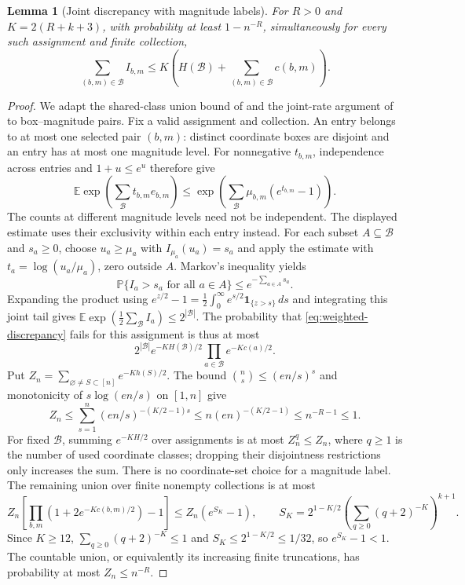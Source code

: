 \documentclass[11pt]{article}
\theoremstyle{spaced}
\newtheorem{lemma}[theorem]{Lemma}
\theoremstyle{remark}
\numberwithin{equation}{section}
\newcommand{\E}{\mathbb E}
\newcommand{\Pp}{\mathbb P}
\begin{document}
\begin{lemma}[Joint discrepancy with magnitude labels]\label{lem:weighted-discrepancy}
For $R>0$ and $K=2(R+k+3)$, with probability at least $1-n^{-R}$,
simultaneously for every such assignment and finite collection,
\begin{equation}\label{eq:weighted-discrepancy}
 \sum_{(b,m)\in\mathcal B}I_{b,m}
 \le K\left(H(\mathcal B)+\sum_{(b,m)\in\mathcal B}c(b,m)\right).
\end{equation}
\end{lemma}
\begin{proof}
We adapt the shared-class union bound of \cite[Lemmas~4.4--4.5]{ZZ}
and the joint-rate argument of \cite[Lemma~5.1]{ZZ} to box--magnitude pairs.
Fix a valid assignment and collection. An entry belongs to at most one
selected pair $(b,m)$: distinct coordinate boxes are disjoint and an
entry has at most one magnitude level. For nonnegative $t_{b,m}$,
independence across entries and $1+u\le e^u$ therefore give
\[
 \E\exp\left(\sum_{\mathcal B}t_{b,m}e_{b,m}\right)
 \le\exp\left(\sum_{\mathcal B}\mu_{b,m}(e^{t_{b,m}}-1)\right).
\]
The counts at different magnitude levels need not be independent.
The displayed estimate uses their exclusivity within each entry instead.
For each subset $A\subseteq\mathcal B$ and $s_a\ge0$, choose
$u_a\ge\mu_a$ with $I_{\mu_a}(u_a)=s_a$ and apply the estimate with
$t_a=\log(u_a/\mu_a)$, zero outside $A$. Markov's inequality yields
\[
 \Pp\{I_a>s_a\text{ for all }a\in A\}\le e^{-\sum_{a\in A}s_a}.
\]
Expanding the product using
$e^{z/2}-1=\frac12\int_0^\infty e^{s/2}\mathbf1_{\{z>s\}}\,ds$
and integrating this joint tail gives
$\E\exp(\frac12\sum_{\mathcal B}I_a)\le2^{|\mathcal B|}$.
The probability that \eqref{eq:weighted-discrepancy} fails for this assignment
is thus at most
\[
 2^{|\mathcal B|}e^{-KH(\mathcal B)/2}
       \prod_{a\in\mathcal B}e^{-Kc(a)/2}.
\]
Put $Z_n=\sum_{\varnothing\ne S\subset[n]}e^{-Kh(S)/2}$.
The bound $\binom ns\le(en/s)^s$ and monotonicity of
$s\log(en/s)$ on $[1,n]$ give
\[
 Z_n\le\sum_{s=1}^n(en/s)^{-(K/2-1)s}
 \le n(en)^{-(K/2-1)}\le n^{-R-1}\le1.
\]
For fixed $\mathcal B$, summing $e^{-KH/2}$ over assignments is at most
$Z_n^q\le Z_n$, where $q\ge1$ is the number of used coordinate
classes; dropping their disjointness restrictions only increases the sum.
There is no coordinate-set choice for a magnitude label.
The remaining union over finite nonempty collections is at most
\[
 Z_n\left[\prod_{b,m}(1+2e^{-Kc(b,m)/2})-1\right]
 \le Z_n(e^{S_K}-1),\qquad
 S_K=2^{1-K/2}\left(\sum_{q\ge0}(q+2)^{-K}\right)^{k+1}.
\]
Since $K\ge12$, $\sum_{q\ge0}(q+2)^{-K}\le1$ and
$S_K\le2^{1-K/2}\le1/32$, so $e^{S_K}-1<1$.
The countable union, or equivalently its increasing finite truncations,
has probability at most $Z_n\le n^{-R}$.
\end{proof}
\end{document}
